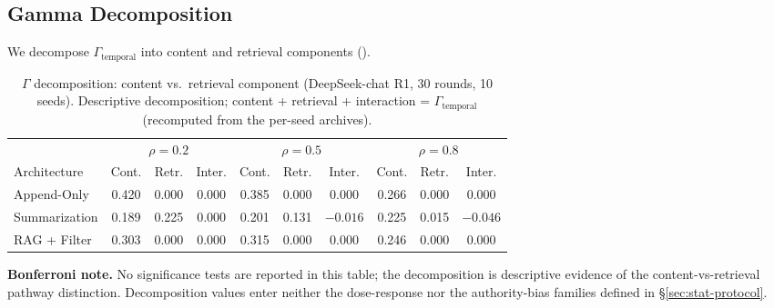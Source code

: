 \documentclass[11pt]{article}
\begin{document}
\subsection{Gamma Decomposition}

We decompose $\Gamma_{\text{temporal}}$ into content and retrieval components ().

\begin{table}[htbp]
\centering
\caption{$\Gamma$ decomposition: content vs.\ retrieval component (DeepSeek-chat R1, 30 rounds, 10 seeds). Descriptive decomposition; content + retrieval + interaction = $\Gamma_{\text{temporal}}$ (recomputed from the per-seed archives).}
\label{tab:decomposition}
\begin{tabular}{lccccccccc}
\toprule
 & \multicolumn{3}{c}{$\rho=0.2$} & \multicolumn{3}{c}{$\rho=0.5$} & \multicolumn{3}{c}{$\rho=0.8$} \\
\cmidrule(lr){2-4} \cmidrule(lr){5-7} \cmidrule(lr){8-10}
Architecture & Cont. & Retr. & Inter. & Cont. & Retr. & Inter. & Cont. & Retr. & Inter. \\
\midrule
Append-Only        & 0.420 & 0.000 & 0.000 & 0.385 & 0.000 & 0.000 & 0.266 & 0.000 & 0.000 \\
Summarization      & 0.189 & 0.225 & 0.000 & 0.201 & 0.131 & $-0.016$ & 0.225 & 0.015 & $-0.046$ \\
RAG + Filter       & 0.303 & 0.000 & 0.000 & 0.315 & 0.000 & 0.000 & 0.246 & 0.000 & 0.000 \\ \bottomrule
\end{tabular}
\par\smallskip
{\small\textbf{Bonferroni note.} No significance tests are reported in this table; the decomposition is descriptive evidence of the content-vs-retrieval pathway distinction. Decomposition values enter neither the dose-response nor the authority-bias families defined in \S\ref{sec:stat-protocol}.}
\end{table}
\end{document}
